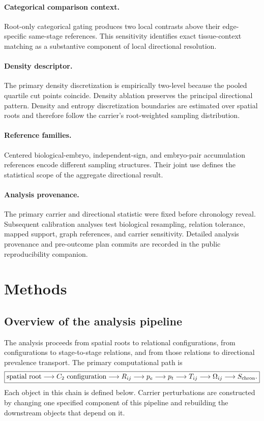 \documentclass[11pt]{article}
\begin{document}
\paragraph{Categorical comparison context.}
Root-only categorical gating produces two local contrasts above their edge-specific same-stage references. This sensitivity identifies exact tissue-context matching as a substantive component of local directional resolution.

\paragraph{Density descriptor.}
The primary density discretization is empirically two-level because the pooled quartile cut points coincide. Density ablation preserves the principal directional pattern. Density and entropy discretization boundaries are estimated over spatial roots and therefore follow the carrier's root-weighted sampling distribution.

\paragraph{Reference families.}
Centered biological-embryo, independent-sign, and embryo-pair accumulation references encode different sampling structures. Their joint use defines the statistical scope of the aggregate directional result.

\paragraph{Analysis provenance.}
The primary carrier and directional statistic were fixed before chronology reveal. Subsequent calibration analyses test biological resampling, relation tolerance, mapped support, graph references, and carrier sensitivity. Detailed analysis provenance and pre-outcome plan commits are recorded in the public reproducibility companion.

\section{Methods}

\subsection{Overview of the analysis pipeline}

The analysis proceeds from spatial roots to relational configurations, from configurations to stage-to-stage relations, and from those relations to directional prevalence transport. The primary computational path is
\[
\boxed{
\text{spatial root}
\longrightarrow
C_2\text{ configuration}
\longrightarrow
R_{ij}
\longrightarrow
p_e
\longrightarrow
p_t
\longrightarrow
T_{ij}
\longrightarrow
\Omega_{ij}
\longrightarrow
S_{\rm chron}.
}
\]
Each object in this chain is defined below. Carrier perturbations are constructed by changing one specified component of this pipeline and rebuilding the downstream objects that depend on it.
\end{document}
